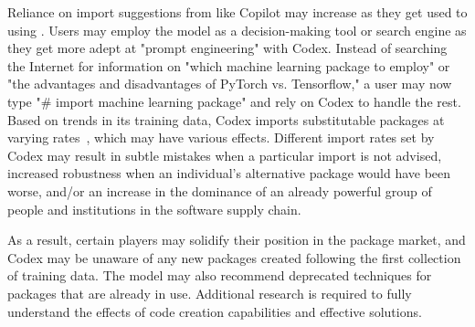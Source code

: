 Reliance on import suggestions from \cct{} like Copilot may increase as they get used to using \cct{}. 
Users may employ the model as a decision-making tool or search engine as they get more adept at "prompt engineering" with Codex. 
Instead of searching the Internet for information on "which machine learning package to employ" or "the advantages and disadvantages of PyTorch vs. Tensorflow," a user may now type "\# import machine learning package" and rely on Codex to handle the rest.
Based on trends in its training data, Codex imports substitutable packages at varying rates~\cite{copilot}, which may have various effects. 
Different import rates set by Codex may result in subtle mistakes when a particular import is not advised, increased robustness when an individual's alternative package would have been worse, and/or an increase in the dominance of an already powerful group of people and institutions in the software supply chain.

As a result, certain players may solidify their position in the package market, and Codex may be unaware of any new packages created following the first collection of training data. The model may also recommend deprecated techniques for packages that are already in use. Additional research is required to fully understand the effects of code creation capabilities and effective solutions.

